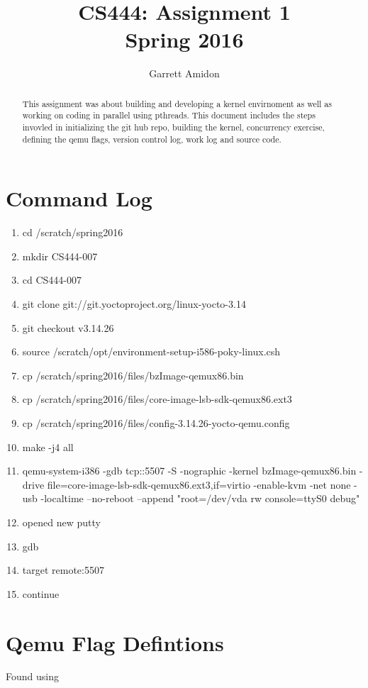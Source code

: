 \documentclass[letterpaper,10pt,titlepage,draftclsnofoot,onecolumn]{IEEEtran}
\title{CS444: Assignment 1 \\
	\large Spring 2016}
\author{Garrett Amidon}
\begin{document}
\begin{titlingpage}
    \maketitle
	\centering{}
    \begin{abstract}
        This assignment was about building and developing a kernel envirnoment as well as working on coding in parallel using pthreads. This document includes the steps invovled in initializing the git hub repo, building the kernel, concurrency exercise, defining the qemu flags, version control log, work log and source code.  
    \end{abstract}
\end{titlingpage}
\section{Command Log}
\begin{enumerate}
\item cd /scratch/spring2016
\item mkdir CS444-007
\item cd CS444-007
\item git clone git://git.yoctoproject.org/linux-yocto-3.14
\item git checkout v3.14.26
\item source /scratch/opt/environment-setup-i586-poky-linux.csh
\item cp /scratch/spring2016/files/bzImage-qemux86.bin
\item cp /scratch/spring2016/files/core-image-lsb-sdk-qemux86.ext3 
\item cp /scratch/spring2016/files/config-3.14.26-yocto-qemu.config
\item make -j4 all
\item qemu-system-i386 -gdb tcp::5507 -S -nographic -kernel bzImage-qemux86.bin -drive file=core-image-lsb-sdk-qemux86.ext3,if=virtio -enable-kvm -net none -usb -localtime --no-reboot --append "root=/dev/vda rw console=ttyS0 debug"
\item opened new putty
\item gdb
\item target remote:5507
\item continue
\end{enumerate}
\section{Qemu Flag Defintions} 
Found using \cite{qemu_flags}
\end{document}
